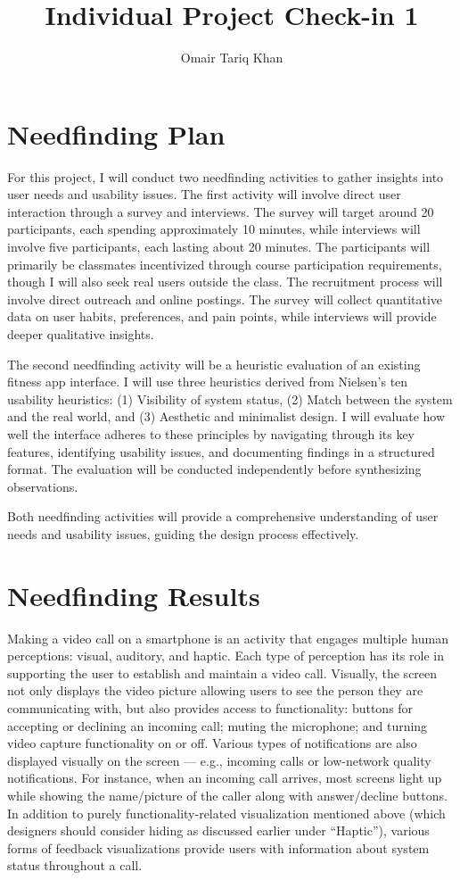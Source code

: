 \documentclass[
	letterpaper, %
]{jdf}
\author{Omair Tariq Khan}
\title{Individual Project Check-in 1}
\begin{document}

\maketitle
\hfill \break
\hfill \break


\section{Needfinding Plan}
For this project, I will conduct two needfinding activities to gather insights into user needs and usability issues. The first activity will involve direct user interaction through a survey and interviews. The survey will target around 20 participants, each spending approximately 10 minutes, while interviews will involve five participants, each lasting about 20 minutes. The participants will primarily be classmates incentivized through course participation requirements, though I will also seek real users outside the class. The recruitment process will involve direct outreach and online postings. The survey will collect quantitative data on user habits, preferences, and pain points, while interviews will provide deeper qualitative insights.

The second needfinding activity will be a heuristic evaluation of an existing fitness app interface. I will use three heuristics derived from Nielsen’s ten usability heuristics: (1) Visibility of system status, (2) Match between the system and the real world, and (3) Aesthetic and minimalist design. I will evaluate how well the interface adheres to these principles by navigating through its key features, identifying usability issues, and documenting findings in a structured format. The evaluation will be conducted independently before synthesizing observations.

Both needfinding activities will provide a comprehensive understanding of user needs and usability issues, guiding the design process effectively.
\newpage

\section{Needfinding Results }
Making a video call on a smartphone is an activity that engages multiple human perceptions: visual, auditory, and haptic. Each type of perception has its role in supporting the user to establish and maintain a video call. Visually, the screen not only displays the video picture allowing users to see the person they are communicating with, but also provides access to functionality: buttons for accepting or declining an incoming call; muting the microphone; and turning video capture functionality on or off. Various types of notifications are also displayed visually on the screen — e.g., incoming calls or low-network quality notifications. For instance, when an incoming call arrives, most screens light up while showing the name/picture of the caller along with answer/decline buttons. In addition to purely functionality-related visualization mentioned above (which designers should consider hiding as discussed earlier under “Haptic”), various forms of feedback visualizations provide users with information about system status throughout a call.
\end{document}
